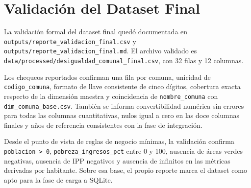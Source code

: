 \chapter{Validación del Dataset Final}

La validación formal del dataset final quedó documentada en \texttt{outputs/reporte\_validacion\_final.csv} y \texttt{outputs/reporte\_validacion\_final.md}. El archivo validado es \texttt{data/processed/desigualdad\_comunal\_final.csv}, con 32 filas y 12 columnas.



Los chequeos reportados confirman una fila por comuna, unicidad de \texttt{codigo\_comuna}, formato de llave consistente de cinco dígitos, cobertura exacta respecto de la dimensión maestra y coincidencia de \texttt{nombre\_comuna} con \texttt{dim\_comuna\_base.csv}. También se informa convertibilidad numérica sin errores para todas las columnas cuantitativas, nulos igual a cero en las doce columnas finales y años de referencia consistentes con la fase de integración.

Desde el punto de vista de reglas de negocio mínimas, la validación confirma \texttt{poblacion > 0}, \texttt{pobreza\_ingresos\_pct} entre 0 y 100, ausencia de áreas verdes negativas, ausencia de IPP negativos y ausencia de infinitos en las métricas derivadas por habitante. Sobre esa base, el propio reporte marca el dataset como apto para la fase de carga a SQLite.
